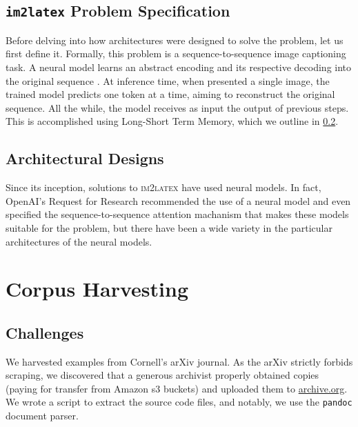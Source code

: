 \documentclass{article}
\begin{document}
\cprotect
\subsection{\texttt{im2latex} Problem Specification}

Before delving into how architectures were designed to solve the problem, let us
first define it. Formally, this problem is a sequence-to-sequence image
captioning task. A neural model learns an abstract encoding and its respective
decoding into the original sequence \parencite[1]{deng2016you}. At inference
time, when presented a single image, the trained model predicts one token at a
time, aiming to reconstruct the original sequence. All the while, the model
receives as input the output of previous steps. This is accomplished using
Long-Short Term Memory, which we outline in \ref{netarch}.

\subsection{Architectural Designs}
\label{netarch}

Since its inception, solutions to \textsc{im2latex} have used neural models. In
fact, OpenAI's Request for Research recommended the use of a neural model and
even specified the sequence-to-sequence attention machanism that makes these
models suitable for the problem, but there have been a wide variety in the
particular architectures of the neural models.


\citeauthor{deng2016you}
\citeauthor{genthial2016image}
\citeauthor{wang2019translating}
\citeauthor{bender2019learning}

\section{Corpus Harvesting}


\subsection{Challenges}

We harvested examples from Cornell's arXiv journal. As the arXiv strictly
forbids scraping, we discovered that a generous archivist properly obtained
copies (paying for transfer from Amazon s3 buckets) and uploaded them to
\url{archive.org}. We wrote a script to extract the source code files, and
notably, we use the \texttt{pandoc} document parser.
\end{document}
